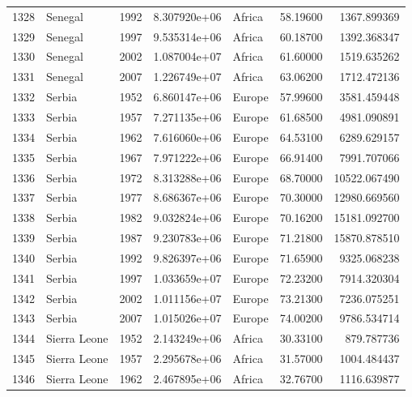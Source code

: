 \documentclass[
  letterpaper,
  DIV=11,
  numbers=noendperiod]{scrreprt}
\begin{document}
\begin{tabular}{llrrlrr}
1328 &                   Senegal &  1992 &  8.307920e+06 &    Africa &  58.19600 &    1367.899369 \\
1329 &                   Senegal &  1997 &  9.535314e+06 &    Africa &  60.18700 &    1392.368347 \\
1330 &                   Senegal &  2002 &  1.087004e+07 &    Africa &  61.60000 &    1519.635262 \\
1331 &                   Senegal &  2007 &  1.226749e+07 &    Africa &  63.06200 &    1712.472136 \\
1332 &                    Serbia &  1952 &  6.860147e+06 &    Europe &  57.99600 &    3581.459448 \\
1333 &                    Serbia &  1957 &  7.271135e+06 &    Europe &  61.68500 &    4981.090891 \\
1334 &                    Serbia &  1962 &  7.616060e+06 &    Europe &  64.53100 &    6289.629157 \\
1335 &                    Serbia &  1967 &  7.971222e+06 &    Europe &  66.91400 &    7991.707066 \\
1336 &                    Serbia &  1972 &  8.313288e+06 &    Europe &  68.70000 &   10522.067490 \\
1337 &                    Serbia &  1977 &  8.686367e+06 &    Europe &  70.30000 &   12980.669560 \\
1338 &                    Serbia &  1982 &  9.032824e+06 &    Europe &  70.16200 &   15181.092700 \\
1339 &                    Serbia &  1987 &  9.230783e+06 &    Europe &  71.21800 &   15870.878510 \\
1340 &                    Serbia &  1992 &  9.826397e+06 &    Europe &  71.65900 &    9325.068238 \\
1341 &                    Serbia &  1997 &  1.033659e+07 &    Europe &  72.23200 &    7914.320304 \\
1342 &                    Serbia &  2002 &  1.011156e+07 &    Europe &  73.21300 &    7236.075251 \\
1343 &                    Serbia &  2007 &  1.015026e+07 &    Europe &  74.00200 &    9786.534714 \\
1344 &              Sierra Leone &  1952 &  2.143249e+06 &    Africa &  30.33100 &     879.787736 \\
1345 &              Sierra Leone &  1957 &  2.295678e+06 &    Africa &  31.57000 &    1004.484437 \\
1346 &              Sierra Leone &  1962 &  2.467895e+06 &    Africa &  32.76700 &    1116.639877 \\

\end{tabular}
\end{document}
